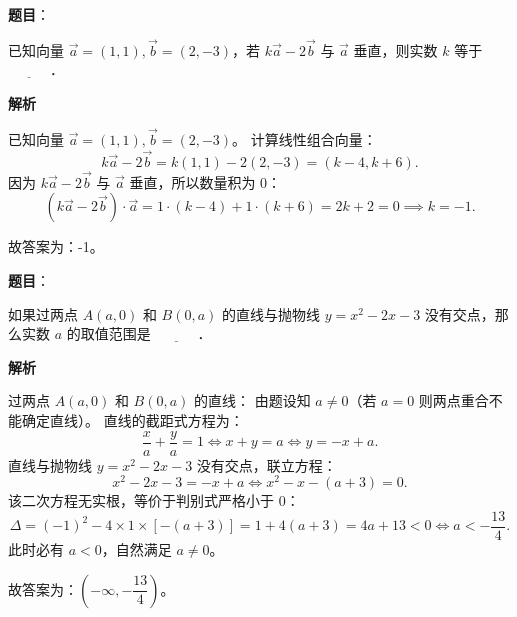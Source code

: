 \begin{answer}

\textbf{题目}：

已知向量 $\vec{a} = (1, 1), \vec{b} = (2, -3)$，若 $k\vec{a} - 2\vec{b}$ 与 $\vec{a}$ 垂直，则实数 $k$ 等于 $\underline{\hspace{3em}}$．

\textbf{解析}

已知向量 $\vec{a} = (1, 1), \vec{b} = (2, -3)$。
计算线性组合向量：
\nopagebreak[4]
\[
k\vec{a} - 2\vec{b} = k(1, 1) - 2(2, -3) = (k - 4, k + 6).
\]
因为 $k\vec{a} - 2\vec{b}$ 与 $\vec{a}$ 垂直，所以数量积为 0：
\nopagebreak[4]
\[
(k\vec{a} - 2\vec{b}) \cdot \vec{a} = 1 \cdot (k - 4) + 1 \cdot (k + 6) = 2k + 2 = 0 \implies k = -1.
\]

故答案为：-1。


\end{answer}
\begin{answer}

\textbf{题目}：

如果过两点 $A(a, 0)$ 和 $B(0, a)$ 的直线与抛物线 $y = x^2 - 2x - 3$ 没有交点，那么实数 $a$ 的取值范围是 $\underline{\hspace{3em}}$．

\textbf{解析}

过两点 $A(a, 0)$ 和 $B(0, a)$ 的直线：
由题设知 $a \neq 0$（若 $a = 0$ 则两点重合不能确定直线）。
直线的截距式方程为：
\nopagebreak[4]
\[
\dfrac{x}{a} + \dfrac{y}{a} = 1 \iff x + y = a \iff y = -x + a.
\]
直线与抛物线 $y = x^2 - 2x - 3$ 没有交点，联立方程：
\nopagebreak[4]
\[
x^2 - 2x - 3 = -x + a \iff x^2 - x - (a + 3) = 0.
\]
该二次方程无实根，等价于判别式严格小于 0：
\nopagebreak[4]
\[
\Delta = (-1)^2 - 4 \times 1 \times [-(a + 3)] = 1 + 4(a + 3) = 4a + 13 < 0 \iff a < -\dfrac{13}{4}.
\]
此时必有 $a < 0$，自然满足 $a \neq 0$。

故答案为：$\left(-\infty, -\dfrac{13}{4}\right)$。


\end{answer}
